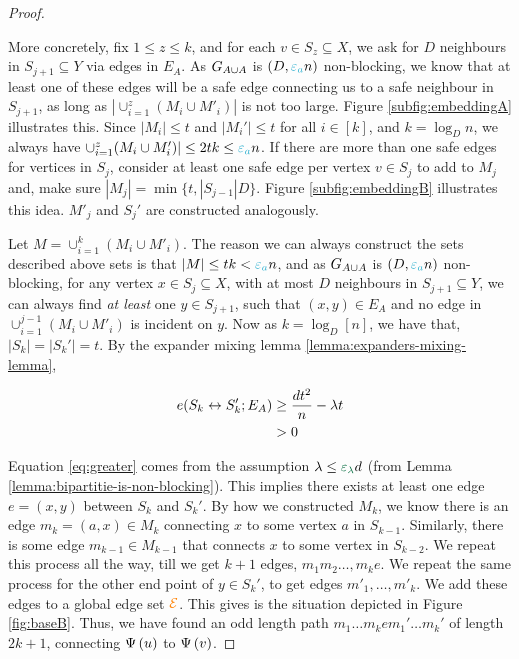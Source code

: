 \documentclass[11pt]{article}
\begin{document}
\begin{proof}
\begin{tcolorbox}
More concretely, fix $1 \leq z \leq k$, and for each $v \in S_z \subseteq X$, we ask for $D$ neighbours in $S_{j+1} \subseteq Y$ via edges in $E_A$.
As $G_{A \cup A}$ is $(D, \epsilonA n)$ non-blocking, we know that at least one of these edges will be a safe edge connecting us to a safe neighbour in $S_{j+1}$, as long as $|\cup_{i=1}^{z} (M_i \cup M'_i)|$ is not too large.
Figure \ref{subfig:embeddingA} illustrates this.
Since $|M_i| \leq t$ and $|M_i'| \leq t$ for all $i \in [k]$, and $k = \log_D n$, we always have $\cup_{i=1}^{z} (M_i \cup M'_i)| \leq 2tk \leq \epsilonA n$.
If there are more than one safe edges for  vertices in $S_j$, consider at least one safe edge per vertex $v \in S_j$ to add to $M_j$ and, make sure $|M_j| = \min\{t, |S_{j-1}|D\}$.
Figure \ref{subfig:embeddingB} illustrates this idea.
$M'_j$ and $S_j'$ are constructed analogously.\\



\end{tcolorbox}

Let $M = \cup_{i=1}^k (M_i \cup M'_i)$.
The reason we can always construct the sets described above sets is that $|M| \leq tk < \epsilonA n$, and as $G_{A \cup A}$ is $(D, \epsilonA n)$ non-blocking, for any vertex $x \in S_j \subseteq X$, with at most $D$ neighbours in $S_{j+1} \subseteq Y$, we can always find \emph{at least} one $y \in S_{j+1}$, such that $(x,y) \in E_A$ and no edge in $\cup_{i=1}^{j-1} (M_i \cup M'_i)$ is incident on $y$.
Now as $k = \log_D[n]$, we have that, $|S_k| = |S_k'|= t$.
By the expander mixing lemma \ref{lemma:expanders-mixing-lemma},

\begin{align}
e(S_k \leftrightarrow S_k'; E_A)
 &\geq \frac{d t^2}{n} - \lambda t \\
	&> 0 \label{eq:greater}
\end{align}

Equation \eqref{eq:greater} comes from the assumption $\lambda \leq \epsilonL d$ (from Lemma \ref{lemma:bipartitie-is-non-blocking}).
This implies there exists at least one edge $e=(x,y)$ between $S_k$ and $S_k'$.
By how we constructed $M_k$, we know there is an edge $m_k = (a,x) \in M_k$ connecting $x$ to some vertex $a$ in $S_{k-1}$. 
Similarly, there is some edge $m_{k-1} \in M_{k-1}$ that connects $x$ to some vertex in $S_{k-2}$.
We repeat this process all the way, till we get $k+1$ edges, $m_1 m_2 \dots, m_k e$.
We repeat the same process for the other end point of $y \in S_k'$, to get edges $m'_1, \dots, m'_k$.
We add these edges to a global edge set $\textcolor{orange}{\mathcal{E}}$.
This gives is the situation depicted in Figure \ref{fig:baseB}.
Thus, we have found an odd length path $m_1\dots m_k e m_1'\dots m_k'$ of length $2k+1$, connecting $\Psi\left(u\right)$ to $\Psi\left(v\right)$.


\end{proof}
\end{document}
